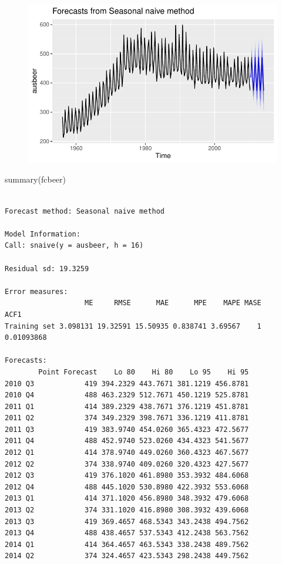 \documentclass[
  letterpaper,
  DIV=11,
  numbers=noendperiod]{scrartcl}
\newenvironment{Shaded}{\begin{snugshade}}{\end{snugshade}}
\newcommand{\FunctionTok}[1]{\textcolor[rgb]{0.28,0.35,0.67}{#1}}
\newcommand{\NormalTok}[1]{\textcolor[rgb]{0.00,0.23,0.31}{#1}}
\begin{document}
\begin{figure}[H]

{\centering \includegraphics{forecasting_datacamp_ex_files/figure-pdf/unnamed-chunk-7-2.pdf}

}

\end{figure}

\begin{Shaded}
\begin{Highlighting}[]
\FunctionTok{summary}\NormalTok{(fcbeer)}
\end{Highlighting}
\end{Shaded}

\begin{verbatim}

Forecast method: Seasonal naive method

Model Information:
Call: snaive(y = ausbeer, h = 16) 

Residual sd: 19.3259 

Error measures:
                   ME     RMSE      MAE      MPE    MAPE MASE       ACF1
Training set 3.098131 19.32591 15.50935 0.838741 3.69567    1 0.01093868

Forecasts:
        Point Forecast    Lo 80    Hi 80    Lo 95    Hi 95
2010 Q3            419 394.2329 443.7671 381.1219 456.8781
2010 Q4            488 463.2329 512.7671 450.1219 525.8781
2011 Q1            414 389.2329 438.7671 376.1219 451.8781
2011 Q2            374 349.2329 398.7671 336.1219 411.8781
2011 Q3            419 383.9740 454.0260 365.4323 472.5677
2011 Q4            488 452.9740 523.0260 434.4323 541.5677
2012 Q1            414 378.9740 449.0260 360.4323 467.5677
2012 Q2            374 338.9740 409.0260 320.4323 427.5677
2012 Q3            419 376.1020 461.8980 353.3932 484.6068
2012 Q4            488 445.1020 530.8980 422.3932 553.6068
2013 Q1            414 371.1020 456.8980 348.3932 479.6068
2013 Q2            374 331.1020 416.8980 308.3932 439.6068
2013 Q3            419 369.4657 468.5343 343.2438 494.7562
2013 Q4            488 438.4657 537.5343 412.2438 563.7562
2014 Q1            414 364.4657 463.5343 338.2438 489.7562
2014 Q2            374 324.4657 423.5343 298.2438 449.7562
\end{verbatim}
\end{document}
